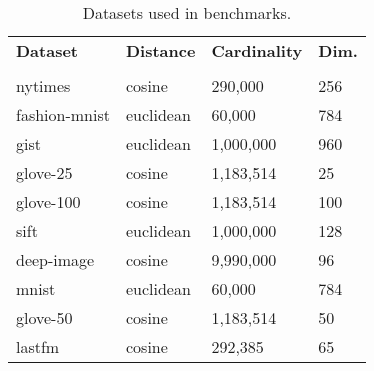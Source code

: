 \begin{table}[!t]
    \caption{Datasets used in benchmarks.}
    \label{table:datasets:summary}
    \vskip 0.15in
    \begin{center}
    \begin{small}
    \begin{sc}
    \begin{tabular}{|l|l|l|l|}
    \hline
    \textbf{Dataset} & \textbf{Distance}  &\textbf{Cardinality}  & \textbf{Dim.}  \\
    &                &                  &                         \\
    \hline
    nytimes          & cosine              & 290,000            & 256       \\
    \hline
    fashion-mnist    & euclidean              & 60,000             & 784       \\
    \hline 
    gist             & euclidean              & 1,000,000          & 960       \\
    \hline
    glove-25         & cosine              & 1,183,514          & 25        \\
    \hline
    glove-100        & cosine              & 1,183,514          & 100       \\
    \hline
    sift             & euclidean              & 1,000,000          & 128       \\
    \hline
    deep-image       & cosine              & 9,990,000          & 96        \\
    \hline
    mnist            & euclidean              & 60,000             & 784       \\
    \hline
    glove-50         & cosine              & 1,183,514          & 50        \\
    \hline
    lastfm           & cosine              & 292,385            & 65        \\
    \hline
    \end{tabular}
    \end{sc}
    \end{small}
    \end{center}
    \vskip -0.1in
    \end{table}